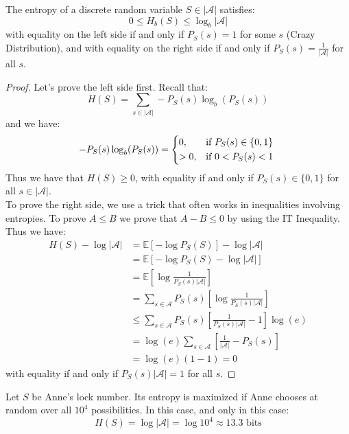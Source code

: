 \begin{theorem}
    The entropy of a discrete random variable $S \in |\mathcal{A}|$ satisfies:
    \[
        0 \leq H_b(S) \leq \log_b |\mathcal{A}|
    \]
    with equality on the left side if and only if $P_S(s) = 1$ for some $s$ (Crazy Distribution), and with equality on the right side if and only if $P_S(s) = \frac{1}{|\mathcal{A}|}$ for all $s$.
\end{theorem}
\begin{proof}
    Let's prove the left side first. Recall that:
    \[
        H(S) = \sum_{s \in |\mathcal{A}|} - P_S(s) \log_b (P_S(s))
    \]
    and we have:
    \[
        -P_S(s) \log_b (P_S(s)) = \begin{cases*}
            0, & if $P_S(s) \in \{0,1\}$ \\
            > 0, & if $0 < P_S(s) < 1$
        \end{cases*}
    \]
    Thus we have that $H(S) \geq 0$, with equality if and only if $P_S(s) \in \{0,1\}$ for all $s \in |\mathcal{A}|$. \\
    To prove the right side, we use a trick that often works in inequalities involving entropies. To prove $A \leq B$ we prove that $A - B \leq 0$ by using the IT Inequality. Thus we have:
    \begin{align*}
        H(S) - \log |\mathcal{A}| &= \mathbb{E}\left[- \log P_S(S)\right] - \log |\mathcal{A}| \\
        &= \mathbb{E}\left[- \log P_S(S) - \log |\mathcal{A}|\right] \\
        &= \mathbb{E}\left[\log \frac{1}{P_S(s) |\mathcal{A}|}\right] \\
        &= \sum_{s \in \mathcal{A}} P_S(s) \left[\log \frac{1}{P_S(s) |\mathcal{A}|}\right] \\
        &\leq \sum_{s \in \mathcal{A}} P_S(s) \left[\frac{1}{P_S(s) |\mathcal{A}|} - 1\right] \log(e) \\
        &= \log(e) \sum_{s \in \mathcal{A}} \left[\frac{1}{|\mathcal{A}|} - P_S(s)\right] \\
        &= \log(e)(1-1) = 0
    \end{align*}
    with equality if and only if $P_S(s) |\mathcal{A}| = 1$ for all $s$.
\end{proof}

\begin{eg}
    Let $S$ be Anne's lock number. Its entropy is maximized if Anne chooses at random over all $10^4$ possibilities. In this case, and only in this case:
    \[
        H(S) = \log |\mathcal{A}| = \log 10^4 \approx 13.3 \text{ bits}
    \]
\end{eg}

